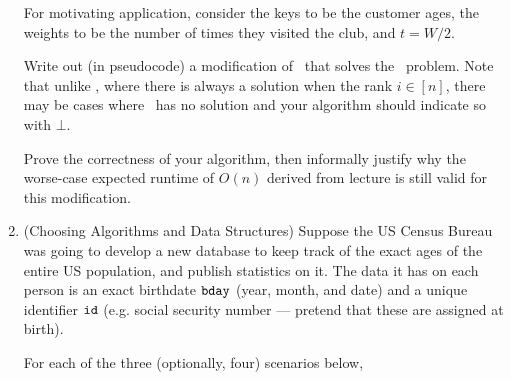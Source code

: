 \documentclass[11pt]{article}
\begin{document}
\begin{enumerate}
    For motivating application, consider the keys to be the customer ages, the weights to be the number of times they visited the club, and $t=W/2$. 
    
    Write out (in pseudocode) a modification of \QuickSelect\ that solves the \WeightedSelection\ problem.  Note that unlike \Selection, where there is always a solution when the rank $i\in [n]$, there may be cases where \WeightedSelection\ has no solution and your algorithm should indicate so with $\bot$. 
    
    Prove the correctness of your algorithm, then informally justify why the worse-case expected runtime of $O(n)$ derived from lecture is still valid for this modification. 


   

   

            

    

 \item (Choosing Algorithms and Data Structures)
     Suppose the US Census Bureau was going to develop a new database to keep track of the exact ages of the entire US population, and publish statistics on it.  The data it has on each person is an exact birthdate
    $\texttt{bday}$ (year, month, and date) and a unique identifier $\texttt{id}$ (e.g. social security number --- pretend that these are assigned at birth). 
    
    For each of the three (optionally, four) scenarios below,


\end{enumerate}
\end{document}
